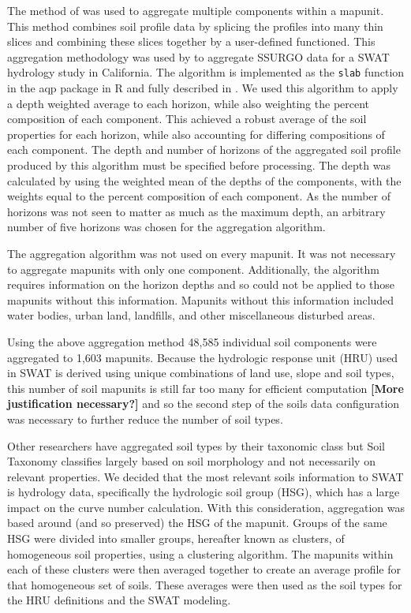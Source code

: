 \documentclass[10pt,letterpaper]{article}%
\begin{document}
		The method of \citet{beaudette_aqp_2013} was used to aggregate multiple components within a mapunit. This method combines soil profile data by splicing the profiles into many thin slices and combining these slices together by a user-defined functioned. This aggregation methodology was used by \citet{gatzke_soilaggregation_2011} to aggregate SSURGO data for a SWAT hydrology study in California. The algorithm is implemented as the \texttt{slab} function in the aqp package in R  and fully described in \citet{beaudette_aqp_2013}. We used this algorithm to apply a depth weighted average to each horizon, while also weighting the percent composition of each component. This achieved a robust average of the soil properties for each horizon, while also accounting for differing compositions of each component. The depth and number of horizons of the aggregated soil profile produced by this algorithm must be specified before processing. The depth was calculated by using the weighted mean of the depths of the components, with the weights equal to the percent composition of each component. As the number of horizons was not seen to matter as much as the maximum depth, an arbitrary number of five horizons was chosen for the aggregation algorithm. 
		
		The aggregation algorithm was not used on every mapunit. It was not necessary to aggregate mapunits with only one component. Additionally, the algorithm requires information on the horizon depths and so could not be applied to those mapunits without this information. Mapunits without this information included water bodies, urban land, landfills, and other miscellaneous disturbed areas. 
		
		Using the above aggregation method 48,585 individual soil components were aggregated to 1,603 mapunits. Because the hydrologic	response unit (HRU) used in SWAT	is derived using unique combinations of land use, slope and soil types, this number of soil mapunits is still far too many for efficient computation \textbf{[More justification necessary?]} and so the second step of the soils data configuration was necessary to further reduce the number of soil types.
		
		Other researchers have aggregated soil types by their taxonomic class \citep{gatzke_soilaggregation_2011} but Soil Taxonomy classifies largely based on soil morphology and not necessarily on relevant properties. We decided that the most relevant soils information to SWAT is hydrology data, specifically the hydrologic soil group (HSG), which has a large impact on the curve number calculation. With this consideration, aggregation was based around (and so preserved) the HSG of the mapunit. Groups of the same HSG were divided into smaller groups, hereafter known as clusters, of homogeneous soil properties, using a clustering algorithm. The mapunits within each of these clusters were then averaged together to create an average profile for that homogeneous set of soils. These averages were then used as the soil types for the HRU definitions and the SWAT modeling.
		
\end{document}

